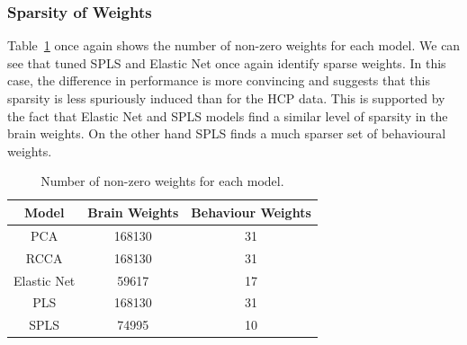 \subsubsection{Sparsity of Weights}

Table~\ref{tab:brain-behaviour-weights-adni} once again shows the number of non-zero weights for each model.
We can see that tuned SPLS and Elastic Net once again identify sparse weights.
In this case, the difference in performance is more convincing and suggests that this sparsity is less spuriously induced than for the HCP data.
This is supported by the fact that Elastic Net and SPLS models find a similar level of sparsity in the brain weights.
On the other hand SPLS finds a much sparser set of behavioural weights.

\begin{table}[h]
\centering
\caption{Number of non-zero weights for each model.}
\begin{tabular}{|c|c|c|}
\hline
Model &  Brain Weights &  Behaviour Weights \\
\hline
PCA        &         168130 &                 31 \\
RCCA       &         168130 &                 31 \\
Elastic Net &          59617 &                 17 \\
PLS        &         168130 &                 31 \\
SPLS       &          74995 &                 10 \\
\hline
\end{tabular}\label{tab:brain-behaviour-weights-adni}
\end{table}

